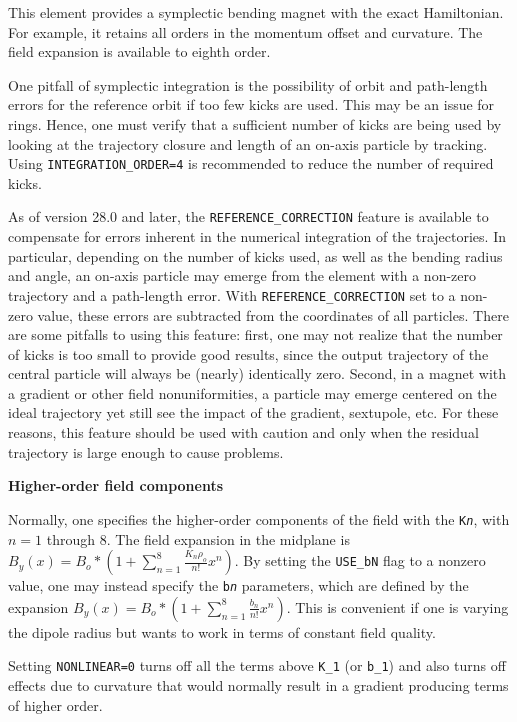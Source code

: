 This element provides a symplectic bending magnet with the exact
Hamiltonian.  For example, it retains all orders in the momentum offset
and curvature.  The field expansion is available to eighth order.

One pitfall of symplectic integration is the possibility of orbit and
path-length errors for the reference orbit if too few kicks are used.
This may be an issue for rings.  Hence, one must verify that a
sufficient number of kicks are being used by looking at the trajectory
closure and length of an on-axis particle by tracking.  Using 
{\tt INTEGRATION\_ORDER=4} is recommended to reduce the number of
required kicks.

As of version 28.0 and later, the \verb|REFERENCE_CORRECTION| feature is available
to compensate for errors inherent in the numerical integration of the trajectories.
In particular, depending on the number of kicks used, as well as the bending radius and angle,
an on-axis particle may emerge from the element with a non-zero trajectory and a path-length error.
With \verb|REFERENCE_CORRECTION| set to a non-zero value, these errors are subtracted from the
coordinates of all particles.
There are some pitfalls to using this feature: first, one may not realize that the number of kicks is too small to
provide good results, since the output trajectory of the central particle will always be
(nearly) identically zero. Second, in a magnet with a gradient or other field nonuniformities, 
a particle may emerge centered on the ideal trajectory yet still see the impact of the gradient, sextupole, etc.
For these reasons, this feature should be used with caution and only when the residual trajectory is 
large enough to cause problems.

{\bf Higher-order field components}

Normally, one specifies the higher-order components of the field with
the {\tt K{\em n}}, with $n=1$ through $8$. The field
expansion in the midplane is $B_y(x) = B_o * (1 +
\sum_{n=1}^8\frac{K_n\rho_o}{n!}x^n)$.  By setting the {\tt USE\_bN}
flag to a nonzero value, one may instead specify the {\tt b{\em n}}
parameters, which are defined by the expansion $B_y(x) = B_o
* (1 + \sum_{n=1}^8\frac{b_n}{n!}x^n)$.  This is convenient if one is
varying the dipole radius but wants to work in terms of constant field
quality.  

Setting {\tt NONLINEAR=0} turns off all the terms above {\tt K\_1} (or {\tt b\_1}) and
also turns off effects due to curvature that would
normally result in a gradient producing terms of higher order.

